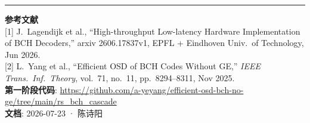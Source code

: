 \documentclass[11pt,a4paper]{article}
\begin{document}
\vspace{6pt}
\hrule
\vspace{4pt}
\noindent\footnotesize{
\textbf{参考文献}\\
{[1]} J.\ Lagendijk et al., ``High-throughput Low-latency Hardware Implementation of BCH Decoders,''
arxiv 2606.17837v1, EPFL + Eindhoven Univ.\ of Technology, Jun 2026.\\
{[2]} L.\ Yang et al., ``Efficient OSD of BCH Codes Without GE,''
{\it IEEE Trans.\ Inf.\ Theory}, vol.\ 71, no.\ 11, pp.\ 8294--8311, Nov 2025.\\
\textbf{第一阶段代码}: \url{https://github.com/a-yeyang/efficient-osd-bch-no-ge/tree/main/rs_bch_cascade}\\
\textbf{文档}: 2026-07-23 · 陈诗阳
}
\end{document}
